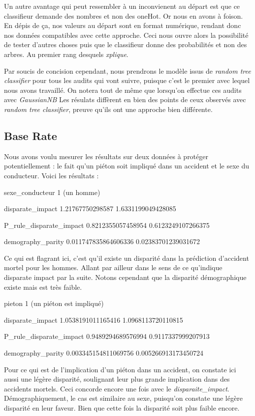 \documentclass{article}
\begin{document}
    Un autre avantage qui peut ressembler à un inconvienent au départ est que ce classifieur demande des nombres et non des oneHot. Or nous en 
    avons à foison. En dépis de ça, nos valeurs au départ sont en format numérique, rendant donc nos données compatibles avec cette approche.
    Ceci nous ouvre alors la possibilité de tester d'autres choses puis que le classifieur donne des probabilités et non des arbres. Au premier 
    rang desquels \textit{xplique}. 
    
    Par soucis de concision cependant, nous prendrons le modèle issus de \textit{random tree classifier} pour tous les audits qui vont suivre, 
    puisque c'est le premier avec lequel nous avons travaillé. On notera tout de même que lorsqu'on effectue ces audits avec \textit{GaussianNB}
    Les résulats diffèrent en bien des points de ceux observés avec \textit{random tree classifier}, preuve qu'ils ont une approche bien différente.

    \subsection{Base Rate}

    Nous avons voulu mesurer les résultats sur deux données à protéger potentiellement : le fait qu'un piéton soit impliqué dans 
    un accident et le sexe du conducteur. Voici les résultats : 

    sexe\_conducteur 1 (un homme)

    disparate\_impact 1.21767750298587 1.6331199049428085

    P\_rule\_disparate\_impact 0.8212355057458954 0.6123249107266375

    demography\_parity 0.011747835864606336 0.02383701239031672

    Ce qui est flagrant ici, c'est qu'il existe un disparité dans la prédiction d'accident mortel pour les hommes. Allant par ailleur
    dans le sens de ce qu'indique disparate impact par la suite. Notons cependant que la disparité démographique existe mais est très
    faible. 

    pieton 1 (un piéton est impliqué)

    disparate\_impact 1.0538191011165416 1.0968113720110815

    P\_rule\_disparate\_impact 0.9489294689576994 0.9117337999207913

    demography\_parity 0.003345154811069756 0.005266913173450724

    Pour ce qui est de l'implication d'un piéton dans un accident, on constate ici aussi une légère disparité, soulignant leur
    plus grande implication dans des accidents mortels. Ceci concorde encore une fois avec le \textit{disparaite\_impact}. Démographiquement, 
    le cas est similaire au sexe, puisqu'on constate une légère disparité en leur faveur. Bien que cette fois la disparité soit plus
    faible encore. 
\end{document}
